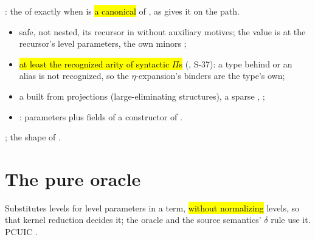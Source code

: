 \begin{definition}
  \label{def:Erasure-casesInfo}
  \leanok
   : the  of  exactly when
   is \hl{a canonical } of , as  gives it
  on the  path.
  \begin{itemize}
  \item {}  safe, not nested, its recursor in  without auxiliary
        motives; the value is  at
        the recursor's level parameters, the own minors ;
  \item {} \hl{at least the recognized arity of syntactic $\Pi$s} (,
        S-37): a type behind  or an alias is not recognized, so the
        $\eta$-expansion's binders are the type's own;
  \item {} a  built from projections (large-eliminating
         structures), a sparse , ;
  \item {}: parameters plus fields of a constructor of .
  \end{itemize}
   ; the shape of .
\end{definition}

\section{The pure oracle}\label{sec:pure-oracle}

\begin{definition}
  \label{def:Erasure-Pure-instLevels}
  \leanok
   Substitutes levels for level parameters in a term, \hl{without
  normalizing} levels, so that kernel reduction decides it; the oracle and the source
  semantics' $\delta$ rule use it.
   PCUIC .
\end{definition}

